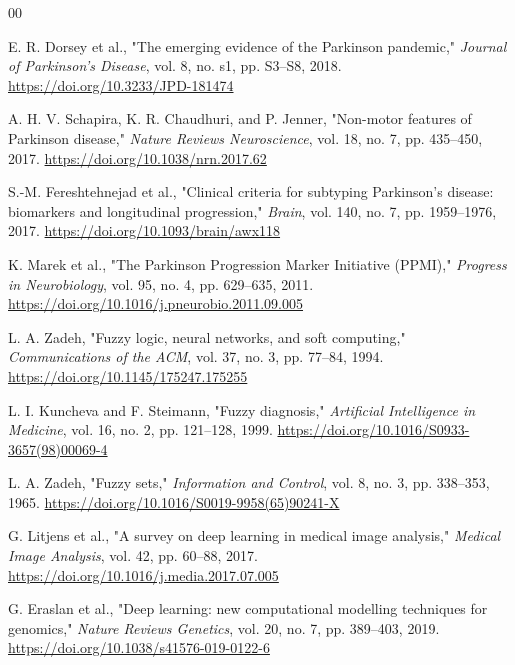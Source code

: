 \documentclass[conference]{IEEEtran}
\begin{document}
\begin{thebibliography}{00}

E. R. Dorsey et al., "The emerging evidence of the Parkinson pandemic," \textit{Journal of Parkinson's Disease}, vol. 8, no. s1, pp. S3--S8, 2018. \href{https://doi.org/10.3233/JPD-181474}{https://doi.org/10.3233/JPD-181474}

A. H. V. Schapira, K. R. Chaudhuri, and P. Jenner, "Non-motor features of Parkinson disease," \textit{Nature Reviews Neuroscience}, vol. 18, no. 7, pp. 435--450, 2017. \href{https://doi.org/10.1038/nrn.2017.62}{https://doi.org/10.1038/nrn.2017.62}

S.-M. Fereshtehnejad et al., "Clinical criteria for subtyping Parkinson's disease: biomarkers and longitudinal progression," \textit{Brain}, vol. 140, no. 7, pp. 1959--1976, 2017. \href{https://doi.org/10.1093/brain/awx118}{https://doi.org/10.1093/brain/awx118}

K. Marek et al., "The Parkinson Progression Marker Initiative (PPMI)," \textit{Progress in Neurobiology}, vol. 95, no. 4, pp. 629--635, 2011. \href{https://doi.org/10.1016/j.pneurobio.2011.09.005}{https://doi.org/10.1016/j.pneurobio.2011.09.005}

L. A. Zadeh, "Fuzzy logic, neural networks, and soft computing," \textit{Communications of the ACM}, vol. 37, no. 3, pp. 77--84, 1994. \href{https://doi.org/10.1145/175247.175255}{https://doi.org/10.1145/175247.175255}

L. I. Kuncheva and F. Steimann, "Fuzzy diagnosis," \textit{Artificial Intelligence in Medicine}, vol. 16, no. 2, pp. 121--128, 1999. \href{https://doi.org/10.1016/S0933-3657(98)00069-4}{https://doi.org/10.1016/S0933-3657(98)00069-4}

L. A. Zadeh, "Fuzzy sets," \textit{Information and Control}, vol. 8, no. 3, pp. 338--353, 1965. \href{https://doi.org/10.1016/S0019-9958(65)90241-X}{https://doi.org/10.1016/S0019-9958(65)90241-X}

G. Litjens et al., "A survey on deep learning in medical image analysis," \textit{Medical Image Analysis}, vol. 42, pp. 60--88, 2017. \href{https://doi.org/10.1016/j.media.2017.07.005}{https://doi.org/10.1016/j.media.2017.07.005}

G. Eraslan et al., "Deep learning: new computational modelling techniques for genomics," \textit{Nature Reviews Genetics}, vol. 20, no. 7, pp. 389--403, 2019. \href{https://doi.org/10.1038/s41576-019-0122-6}{https://doi.org/10.1038/s41576-019-0122-6}


\end{thebibliography}
\end{document}
